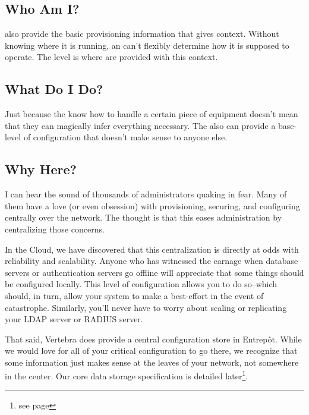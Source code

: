 \subsection{Who Am I?}

\Agents also provide the basic provisioning information that gives \actors{} context.  Without knowing where it is running, an \actor{} can't flexibly determine how it is supposed to operate.  The \agent{} level is where \actors{} are provided with this context.

\subsection{What Do I Do?}

Just because the \actors{} know how to handle a certain piece of equipment doesn't mean that they can magically infer everything necessary.  The \agent{} also can provide a base-level of configuration that doesn't make sense to anyone else.

\subsection{Why Here?}

I can hear the sound of thousands of administrators quaking in fear.  Many of them have a love (or even obsession) with provisioning, securing, and configuring centrally over the network.  The thought is that this eases administration by centralizing those concerns.

In the Cloud, we have discovered that this centralization is directly at odds with reliability and scalability.  Anyone who has witnessed the carnage when database servers or authentication servers go offline will appreciate that some things should be configured locally.  This level of configuration allows you to do so--which should, in turn, allow your system to make a best-effort in the event of catastrophe.  Similarly, you'll never have to worry about scaling or replicating your LDAP server or RADIUS server.

That said, Vertebra does provide a central configuration store in Entrep\^ot.  While we would love for all of your critical configuration to go there, we recognize that some information just makes sense at the leaves of your network, not somewhere in the center.  Our core data storage specification is detailed later\footnote{see page \pageref{ref:core-data-storage}}.

